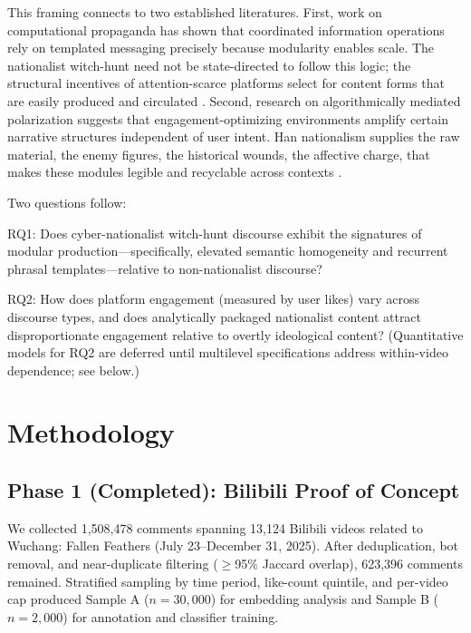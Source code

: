 \documentclass[man, 12pt, mask, floatsintext, nolmodern]{apa7}
\begin{document}
This framing connects to two established literatures. First, work on computational propaganda \parencite{woolley2016} has shown that coordinated information operations rely on templated messaging precisely because modularity enables scale. The nationalist witch-hunt need not be state-directed to follow this logic; the structural incentives of attention-scarce platforms select for content forms that are easily produced and circulated \parencite{papacharissi2015, gillespie2018}. Second, research on algorithmically mediated polarization \parencite{bail2018} suggests that engagement-optimizing environments amplify certain narrative structures independent of user intent. Han nationalism supplies the raw material, the enemy figures, the historical wounds, the affective charge, that makes these modules legible and recyclable across contexts \parencite{hall1996}.

Two questions follow:

RQ1: Does cyber-nationalist witch-hunt discourse exhibit the signatures of modular production---specifically, elevated semantic homogeneity and recurrent phrasal templates---relative to non-nationalist discourse?

RQ2: How does platform engagement (measured by user likes) vary across discourse types, and does analytically packaged nationalist content attract disproportionate engagement relative to overtly ideological content? (Quantitative models for RQ2 are deferred until multilevel specifications address within-video dependence; see below.)

\section{Methodology}

\subsection{Phase 1 (Completed): Bilibili Proof of Concept}

We collected 1,508,478 comments spanning 13,124 Bilibili videos related to Wuchang: Fallen Feathers (July 23--December 31, 2025). After deduplication, bot removal, and near-duplicate filtering ($\geq$95\% Jaccard overlap), 623,396 comments remained. Stratified sampling by time period, like-count quintile, and per-video cap produced Sample A ($n = 30{,}000$) for embedding analysis and Sample B ($n = 2{,}000$) for annotation and classifier training.
\end{document}
